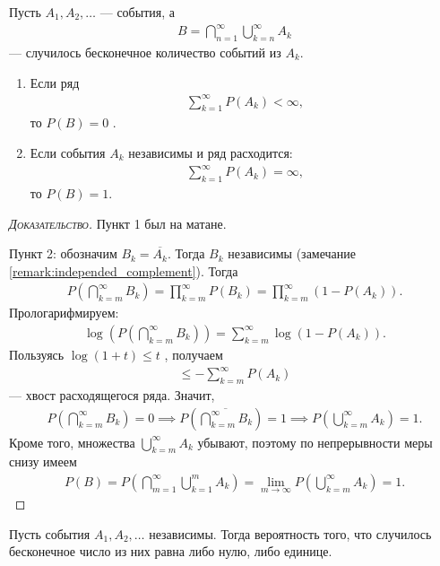 \begin{lm}
 Пусть $A_1, A_2, \ldots$  --- события, а 
 \begin{align*}
  B = \bigcap_{n=1}^{\infty} \bigcup_{k=n}^{\infty} A_k
 \end{align*} --- случилось бесконечное количество событий из $A_k$.
\begin{enumerate}
 \item Если ряд
  \begin{align*}
   \sum_{k=1}^{\infty} P(A_k) < \infty,
  \end{align*} то $P(B) = 0$ .
 \item Если события $A_k$  независимы и ряд расходится:
  \begin{align*}
   \sum_{k=1}^{\infty} P(A_k) = \infty
  ,\end{align*} то $P(B) = 1$.
\end{enumerate} 
\end{lm}
\begin{proof}[\normalfont\textsc{Доказательство}]
 Пункт 1 был на матане.

 Пункт 2: обозначим $B_k = \overline {A_k}$. Тогда $B_k$ независимы (замечание \ref{remark:independed_complement}). Тогда
 \begin{align*}
  P \left( \bigcap_{k=m}^{\infty} B_k \right) = \prod_{k=m}^{\infty} P(B_k) = \prod_{k=m}^{\infty} (1 - P(A_k)).
 \end{align*} Прологарифмируем:
 \begin{align*}
  \log \left( P \left( \bigcap_{k=m}^{\infty} B_k \right) \right) = \sum_{k=m}^{\infty} \log (1 - P(A_k))
 .\end{align*} Пользуясь $\log(1 + t) \leqslant t$ , получаем
 \begin{align*}
  \leqslant - \sum_{k=m}^{\infty} P(A_k)
 \end{align*} --- хвост расходящегося ряда. Значит,
 \begin{align*}
  P \left( \bigcap_{k=m}^{\infty} B_k \right) = 0 \implies P \left( \overline { \bigcap_{k=m}^{\infty} B_k } \right) = 1 \implies P \left( \bigcup_{k=m}^{\infty} A_k \right) = 1.
 \end{align*} Кроме того, множества $\bigcup_{k=m}^{\infty} A_k$  убывают, поэтому по непрерывности меры снизу имеем
 \begin{align*}
  P(B) = P \left( \bigcap_{m=1}^{\infty} \bigcup_{k=1}^{m} A_k \right) = \lim_{m \to \infty} P \left( \bigcup_{k=m}^{\infty} A_k \right) = 1.
 \end{align*}
\end{proof}
\begin{crly}
 Пусть события $A_1, A_2, \ldots$ независимы. Тогда вероятность того, что случилось бесконечное число из них равна либо нулю, либо единице. 
\end{crly}

